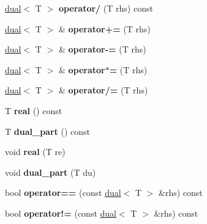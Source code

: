 \begin{DoxyCompactItemize}
\item 
\hypertarget{struct_d_r_d_s_p_1_1dual_a53e0f807765195fe13edf7d23dd531ce}{\hyperlink{struct_d_r_d_s_p_1_1dual}{dual}$<$ T $>$ {\bfseries operator/} (T rhs) const }\label{struct_d_r_d_s_p_1_1dual_a53e0f807765195fe13edf7d23dd531ce}

\item 
\hypertarget{struct_d_r_d_s_p_1_1dual_a1652d072fb86733273e0d6aa39cee0fc}{\hyperlink{struct_d_r_d_s_p_1_1dual}{dual}$<$ T $>$ \& {\bfseries operator+=} (T rhs)}\label{struct_d_r_d_s_p_1_1dual_a1652d072fb86733273e0d6aa39cee0fc}

\item 
\hypertarget{struct_d_r_d_s_p_1_1dual_a6f8a9693191cf66a99e398f5c749ba9f}{\hyperlink{struct_d_r_d_s_p_1_1dual}{dual}$<$ T $>$ \& {\bfseries operator-\/=} (T rhs)}\label{struct_d_r_d_s_p_1_1dual_a6f8a9693191cf66a99e398f5c749ba9f}

\item 
\hypertarget{struct_d_r_d_s_p_1_1dual_a7d871dd2187ebd9696c4ba44fb08ff85}{\hyperlink{struct_d_r_d_s_p_1_1dual}{dual}$<$ T $>$ \& {\bfseries operator$\ast$=} (T rhs)}\label{struct_d_r_d_s_p_1_1dual_a7d871dd2187ebd9696c4ba44fb08ff85}

\item 
\hypertarget{struct_d_r_d_s_p_1_1dual_ab4b3104a03748d96eb06049edcdfb442}{\hyperlink{struct_d_r_d_s_p_1_1dual}{dual}$<$ T $>$ \& {\bfseries operator/=} (T rhs)}\label{struct_d_r_d_s_p_1_1dual_ab4b3104a03748d96eb06049edcdfb442}

\item 
\hypertarget{struct_d_r_d_s_p_1_1dual_a0d78f087bfcf470d9e68a52f15d48075}{T {\bfseries real} () const }\label{struct_d_r_d_s_p_1_1dual_a0d78f087bfcf470d9e68a52f15d48075}

\item 
\hypertarget{struct_d_r_d_s_p_1_1dual_af1d6079aacb711e6e05924bd131ff0d7}{T {\bfseries dual\-\_\-part} () const }\label{struct_d_r_d_s_p_1_1dual_af1d6079aacb711e6e05924bd131ff0d7}

\item 
\hypertarget{struct_d_r_d_s_p_1_1dual_a67f85b3d906b5e82b8d6c272caaef856}{void {\bfseries real} (T re)}\label{struct_d_r_d_s_p_1_1dual_a67f85b3d906b5e82b8d6c272caaef856}

\item 
\hypertarget{struct_d_r_d_s_p_1_1dual_ad80505c912e2b7ff3ce9fc3c716a5872}{void {\bfseries dual\-\_\-part} (T du)}\label{struct_d_r_d_s_p_1_1dual_ad80505c912e2b7ff3ce9fc3c716a5872}

\item 
\hypertarget{struct_d_r_d_s_p_1_1dual_af81b5c0c60c5047a08eb7686418349ff}{bool {\bfseries operator==} (const \hyperlink{struct_d_r_d_s_p_1_1dual}{dual}$<$ T $>$ \&rhs) const }\label{struct_d_r_d_s_p_1_1dual_af81b5c0c60c5047a08eb7686418349ff}

\item 
\hypertarget{struct_d_r_d_s_p_1_1dual_a0cbe25f987e825fa877b0e2bd4171a7a}{bool {\bfseries operator!=} (const \hyperlink{struct_d_r_d_s_p_1_1dual}{dual}$<$ T $>$ \&rhs) const }\label{struct_d_r_d_s_p_1_1dual_a0cbe25f987e825fa877b0e2bd4171a7a}

\end{DoxyCompactItemize}

